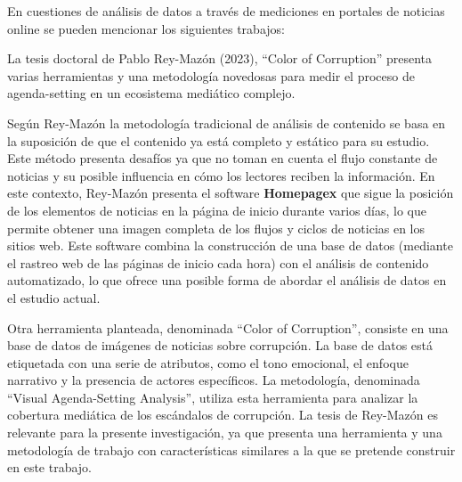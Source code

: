 \documentclass[12pt]{article}
\begin{document}



En cuestiones de análisis de datos a través de mediciones en portales de noticias online se pueden mencionar los siguientes trabajos:

La tesis doctoral de Pablo Rey-Mazón (2023), ``Color of Corruption'' \cite{mazon:2023} presenta varias herramientas y una metodología novedosas para medir el proceso de agenda-setting en un ecosistema mediático complejo.

Según Rey-Mazón la metodología tradicional de análisis de contenido se basa en la suposición de que el contenido ya está completo y estático para su estudio. Este método presenta desafíos ya que no toman en cuenta el flujo constante de noticias y su posible influencia en cómo los lectores reciben la información. En este contexto, Rey-Mazón presenta el software \textbf{Homepagex} que sigue la posición de los elementos de noticias en la página de inicio durante varios días, lo que permite obtener una imagen completa de los flujos y ciclos de noticias en los sitios web. Este software combina la construcción de una base de datos (mediante el rastreo web de las páginas de inicio cada hora) con el análisis de contenido automatizado, lo que ofrece una posible forma de abordar el análisis de datos en el estudio actual.

Otra herramienta planteada, denominada ``Color of Corruption'', consiste en una base de datos de imágenes de noticias sobre corrupción. La base de datos está etiquetada con una serie de atributos, como el tono emocional, el enfoque narrativo y la presencia de actores específicos. La metodología, denominada ``Visual Agenda-Setting Analysis'', utiliza esta herramienta para analizar la cobertura mediática de los escándalos de corrupción. La tesis de Rey-Mazón es relevante para la presente investigación, ya que presenta una herramienta y una metodología de trabajo con características similares a la que se pretende construir en este trabajo. 
\end{document}
